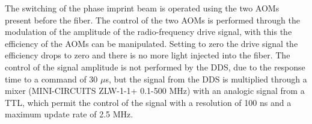 \documentclass[../thesis.tex]{subfiles}
\begin{document}
The switching of the phase imprint beam is operated using the two AOMs present before the fiber. The control of the two AOMs is performed through the modulation of the amplitude of the radio-frequency drive signal, with this the efficiency of the AOMs can be manipulated. Setting to zero the drive signal the efficiency drops to zero and there is no more light injected into the fiber. The control of the signal amplitude is not performed by the DDS, due to the response time to a command of 30 $\mu$s, but the signal from the DDS is multiplied through a mixer (MINI-CIRCUITS ZLW-1-1+ 0.1-500 MHz) with an analogic signal from a TTL, which permit the control of the signal with a resolution of 100 ns and a maximum update rate of 2.5 MHz.\\
\end{document}
